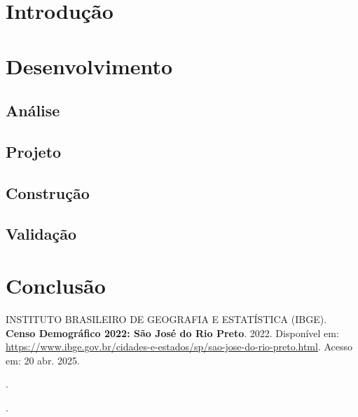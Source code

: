 \documentclass[a5paper, 12pt]{article}
\begin{document}

\newpage
\section{Introdução}
\newpage
\section{Desenvolvimento}

\subsection{Análise}

\subsection{Projeto}

\subsection{Construção}

\subsection{Validação}

\newpage
\section{Conclusão}

\newpage
\renewcommand{\refname}{Bibliografia}
\begin{thebibliography}{09}
 INSTITUTO BRASILEIRO DE GEOGRAFIA E ESTATÍSTICA (IBGE). 
\textbf{Censo Demográfico 2022: São José do Rio Preto}. 
2022. 
Disponível em: \url{https://www.ibge.gov.br/cidades-e-estados/sp/sao-jose-do-rio-preto.html}. 
Acesso em: 20 abr. 2025.

\bibitem{} %
\textbf{}. %

\bibitem{} %
\textbf{}. %

\end{thebibliography}
\end{document}
